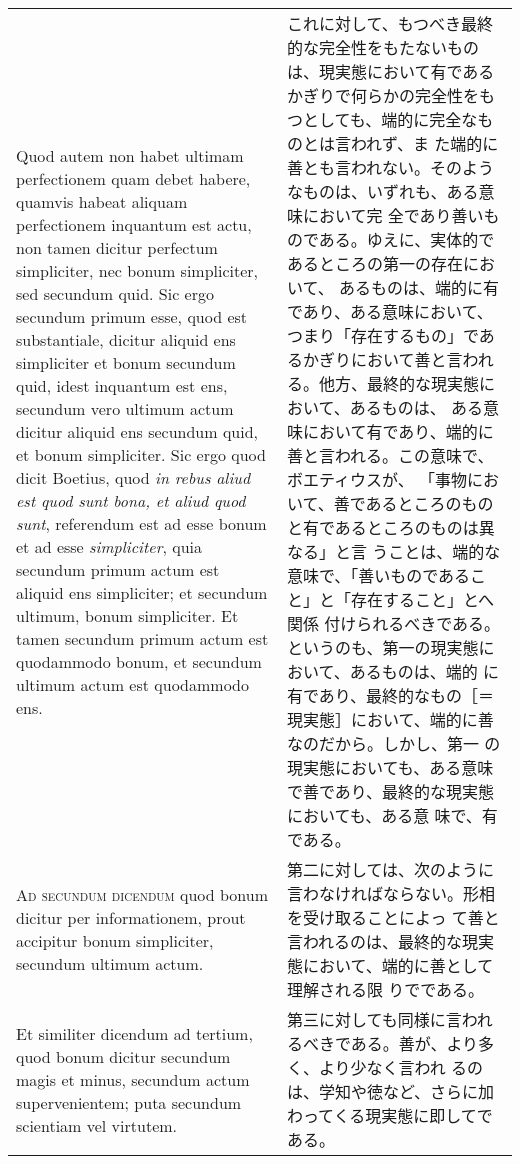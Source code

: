 \documentclass[10pt]{jsarticle} %
\begin{document}
\begin{longtable}{p{21em}p{21em}}
\\


Quod autem non habet ultimam perfectionem quam debet habere, quamvis
 habeat aliquam perfectionem inquantum est actu, non tamen dicitur
 perfectum simpliciter, nec bonum simpliciter, sed secundum quid.  Sic
 ergo secundum primum esse, quod est substantiale, dicitur aliquid ens
 simpliciter et bonum secundum quid, idest inquantum est ens, secundum
 vero ultimum actum dicitur aliquid ens secundum quid, et bonum
 simpliciter.  Sic ergo quod dicit Boetius, quod {\itshape in rebus
 aliud est quod sunt bona, et aliud quod sunt}, referendum est ad esse
 bonum et ad esse {\itshape simpliciter}, quia secundum primum actum est
 aliquid ens simpliciter; et secundum ultimum, bonum simpliciter. Et
 tamen secundum primum actum est quodammodo bonum, et secundum ultimum
 actum est quodammodo ens.

&

これに対して、もつべき最終的な完全性をもたないものは、現実態において有である
 かぎりで何らかの完全性をもつとしても、端的に完全なものとは言われず、ま
 た端的に善とも言われない。そのようなものは、いずれも、ある意味において完
 全であり善いものである。ゆえに、実体的であるところの第一の存在において、
 あるものは、端的に有であり、ある意味において、つまり「存在するもの」であ
 るかぎりにおいて善と言われる。他方、最終的な現実態において、あるものは、
 ある意味において有であり、端的に善と言われる。この意味で、ボエティウスが、
 「事物において、善であるところのものと有であるところのものは異なる」と言
 うことは、端的な意味で、「善いものであること」と「存在すること」とへ関係
 付けられるべきである。というのも、第一の現実態において、あるものは、端的
 に有であり、最終的なもの［＝現実態］において、端的に善なのだから。しかし、第一
 の現実態においても、ある意味で善であり、最終的な現実態においても、ある意
 味で、有である。

\\



{\scshape Ad secundum dicendum} quod bonum dicitur per informationem,
 prout accipitur bonum simpliciter, secundum ultimum actum.


&

第二に対しては、次のように言わなければならない。形相を受け取ることによっ
 て善と言われるのは、最終的な現実態において、端的に善として理解される限
 りでである。

\\

Et similiter dicendum ad tertium, quod bonum dicitur secundum magis et
 minus, secundum actum supervenientem; puta secundum scientiam vel
 virtutem.

&

第三に対しても同様に言われるべきである。善が、より多く、より少なく言われ
 るのは、学知や徳など、さらに加わってくる現実態に即してである。


 

\end{longtable}
\end{document}

